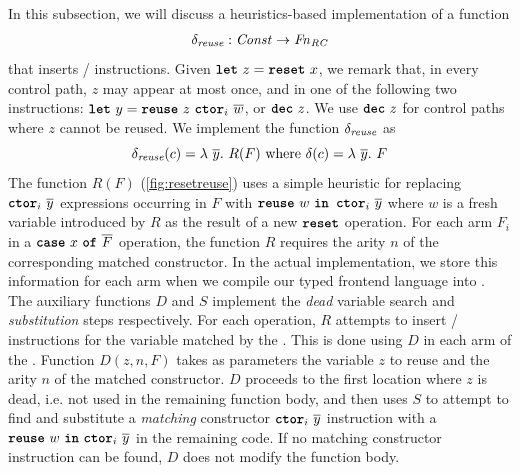 In this subsection, we will discuss a heuristics-based implementation of a function
\[ \delta_{\textit{reuse}} : \mathit{Const} \rightarrow \mathit{Fn}_{\textit{RC}} \]
that inserts / instructions.
Given $\texttt{\textbf{let}}\ z = \texttt{\textbf{reset}}\ x$, we remark that, in every control path, $z$ may
appear at most once, and in one of the following two instructions:
$\kw{let}\ y = \kw{reuse}\ z\ \kw{ctor}_i\ \many{w}$, or $\texttt{\textbf{dec}}\ z$.
We use $\texttt{\textbf{dec}}\ z$ for control paths where $z$ cannot be reused.
We implement the function $\delta_{\textit{reuse}}$ as
\[ \delta_{\textit{reuse}}(c) = \lambda\ \overline{y}.\ R(F) \text{ where } \delta(c) = \lambda\ \overline{y}.\ F \]
The function $R(F)$ (\cref{fig:resetreuse}) uses a simple heuristic for replacing
$\kw{ctor}_i\ \many{y}$ expressions occurring in $F$ with
$\kw{reuse}\ w\ \kw{in ctor}_i\ \many{y}$ where $w$ is a fresh
variable introduced by $R$ as the result of a new $\texttt{\textbf{reset}}$
operation. For each arm $F_i$ in
a $\texttt{\textbf{case}}\ x\ \texttt{\textbf{of}}\ \overline{F}$ operation, the function $R$ requires the arity $n$
of the corresponding matched constructor. In the actual implementation,
we store this information for each arm when we compile our typed frontend language into \pureIR{}.
The auxiliary functions $D$ and $S$ implement the \emph{dead} variable search and \emph{substitution} steps respectively.
For each  operation, $R$ attempts to insert / instructions
for the variable matched by the . This is done using $D$ in each arm of the .
Function $D(z, n, F)$ takes as parameters the variable $z$ to reuse and the arity $n$ of the matched constructor.
$D$ proceeds to the first location where $z$ is dead, i.e. not used in the remaining function body,
and then uses $S$ to attempt to find and substitute a \emph{matching}
constructor $\kw{ctor}_i\ \many{y}$ instruction with a $\kw{reuse}\ w\ \kw{in}\ \kw{ctor}_i\ \many{y}$ in the remaining code.
If no matching constructor instruction can be found, $D$ does not modify the function body.
%
